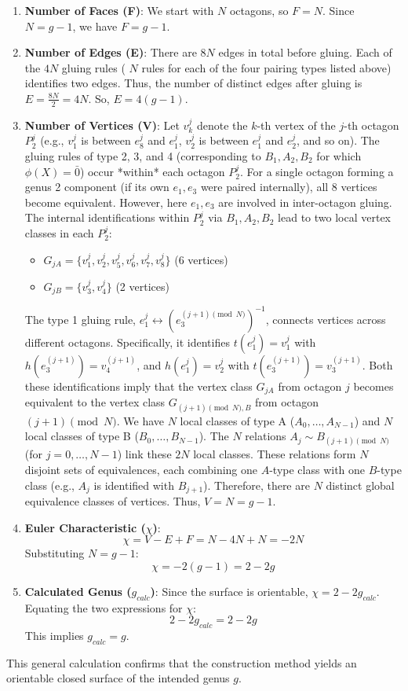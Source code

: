 \documentclass{article}
\theoremstyle{definition}
\theoremstyle{remark}
\begin{document}
\begin{enumerate}
    \item \textbf{Number of Faces (F)}: We start with $N$ octagons, so $F = N$. Since $N=g-1$, we have $F = g-1$.

    \item \textbf{Number of Edges (E)}: There are $8N$ edges in total before gluing. Each of the $4N$ gluing rules ( $N$ rules for each of the four pairing types listed above) identifies two edges. Thus, the number of distinct edges after gluing is $E = \frac{8N}{2} = 4N$. So, $E = 4(g-1)$.

    \item \textbf{Number of Vertices (V)}: Let $v_k^j$ denote the $k$-th vertex of the $j$-th octagon $P_2^j$ (e.g., $v_1^j$ is between $e_8^j$ and $e_1^j$, $v_2^j$ is between $e_1^j$ and $e_2^j$, and so on).
    The gluing rules of type 2, 3, and 4 (corresponding to $B_1, A_2, B_2$ for which $\phi(X)=\bar{0}$) occur *within* each octagon $P_2^j$. For a single octagon forming a genus 2 component (if its own $e_1, e_3$ were paired internally), all 8 vertices become equivalent. However, here $e_1, e_3$ are involved in inter-octagon gluing. The internal identifications within $P_2^j$ via $B_1, A_2, B_2$ lead to two local vertex classes in each $P_2^j$:
    \begin{itemize}
        \item $G_{jA} = \{v_1^j, v_2^j, v_5^j, v_6^j, v_7^j, v_8^j\}$ (6 vertices)
        \item $G_{jB} = \{v_3^j, v_4^j\}$ (2 vertices)
    \end{itemize}
    The type 1 gluing rule, $e_1^j \leftrightarrow (e_3^{(j+1) \pmod N})^{-1}$, connects vertices across different octagons. Specifically, it identifies $t(e_1^j)=v_1^j$ with $h(e_3^{(j+1)})=v_4^{(j+1)}$, and $h(e_1^j)=v_2^j$ with $t(e_3^{(j+1)})=v_3^{(j+1)}$. Both these identifications imply that the vertex class $G_{jA}$ from octagon $j$ becomes equivalent to the vertex class $G_{(j+1) \pmod N, B}$ from octagon $(j+1) \pmod N$.
    We have $N$ local classes of type A ($A_0, \ldots, A_{N-1}$) and $N$ local classes of type B ($B_0, \ldots, B_{N-1}$). The $N$ relations $A_j \sim B_{(j+1) \pmod N}$ (for $j=0, \ldots, N-1$) link these $2N$ local classes. These relations form $N$ disjoint sets of equivalences, each combining one $A$-type class with one $B$-type class (e.g., $A_j$ is identified with $B_{j+1}$). Therefore, there are $N$ distinct global equivalence classes of vertices.
    Thus, $V = N = g-1$.

    \item \textbf{Euler Characteristic ($\chi$)}:
    $$ \chi = V - E + F = N - 4N + N = -2N $$
    Substituting $N = g-1$:
    $$ \chi = -2(g-1) = 2 - 2g $$

    \item \textbf{Calculated Genus ($g_{calc}$)}:
    Since the surface is orientable, $\chi = 2 - 2g_{calc}$.
    Equating the two expressions for $\chi$:
    $$ 2 - 2g_{calc} = 2 - 2g $$
    This implies $g_{calc} = g$.
\end{enumerate}
This general calculation confirms that the construction method yields an orientable closed surface of the intended genus $g$.
\end{document}

